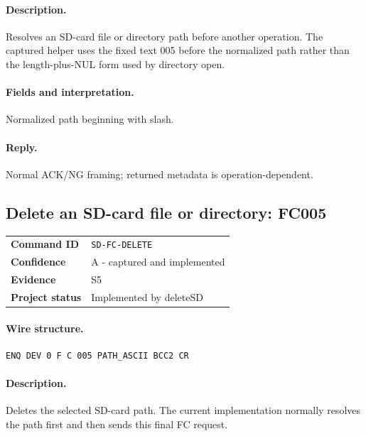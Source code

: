 \documentclass[10pt,letterpaper]{article}
\begin{document}
\paragraph{Description.} Resolves an SD-card file or directory path before another operation. The captured helper uses the fixed text 005 before the normalized path rather than the length-plus-NUL form used by directory open.
\paragraph{Fields and interpretation.}
\begin{description}[style=nextline,leftmargin=3.2cm,labelwidth=3.0cm,font=\normalfont\bfseries]
\item[PATH\_ASCII] Normalized path beginning with slash.
\end{description}
\paragraph{Reply.} Normal ACK/NG framing; returned metadata is operation-dependent.

\subsection{Delete an SD-card file or directory: FC005}
\begin{tabularx}{\textwidth}{@{}>{\bfseries}p{2.8cm}X@{}}
Command ID & \texttt{SD-FC-DELETE} \\
Confidence & A - captured and implemented \\
Evidence & S5 \\
Project status & Implemented by deleteSD \\
\end{tabularx}
\vspace{0.35em}
\paragraph{Wire structure.}
\begin{Verbatim}[breaklines=true,breakanywhere=true,fontsize=\small]
ENQ DEV 0 F C 005 PATH_ASCII BCC2 CR
\end{Verbatim}
\paragraph{Description.} Deletes the selected SD-card path. The current implementation normally resolves the path first and then sends this final FC request.
\end{document}
